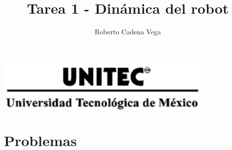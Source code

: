 



\title{ Tarea 1 - Dinámica del robot }

\author{Roberto Cadena Vega} %

\date{ } %




\maketitle %
\begin{marginfigure}
	\includegraphics[width=0.8\textwidth]{../images/UNITEC.png}
\end{marginfigure}

\section{Problemas}

